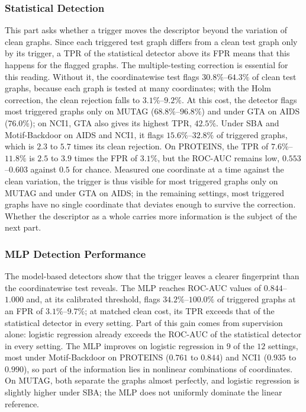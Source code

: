 \documentclass[journal]{IEEEtran}
\begin{document}
\subsubsection{Statistical Detection}\label{sec:res-stat}
This part asks whether a trigger moves the descriptor beyond the variation of
clean graphs. Since each triggered test graph differs from a clean test graph
only by its trigger, a TPR of the statistical detector above its FPR means that
this happens for the flagged graphs. The multiple-testing correction is
essential for this reading. Without it, the coordinatewise test flags
$30.8\%$--$64.3\%$ of clean test graphs, because each graph is tested at many
coordinates; with the Holm correction, the clean rejection falls to
$3.1\%$--$9.2\%$. At this cost, the detector flags most triggered graphs only
on MUTAG ($68.8\%$--$96.8\%$) and under GTA on AIDS ($76.0\%$); on NCI1, GTA also
gives its highest TPR, $42.5\%$. Under SBA and Motif-Backdoor on AIDS and NCI1,
it flags $15.6\%$--$32.8\%$ of triggered graphs, which is $2.3$ to $5.7$ times its
clean rejection. On PROTEINS, the TPR of $7.6\%$--$11.8\%$ is $2.5$ to $3.9$ times
the FPR of $3.1\%$, but the ROC-AUC remains low, $0.553$--$0.603$ against $0.5$
for chance. Measured one coordinate at a time against the clean variation, the
trigger is thus visible for most triggered graphs only on MUTAG and under GTA
on AIDS; in the remaining settings, most triggered graphs have no single
coordinate that deviates enough to survive the correction. Whether the
descriptor as a whole carries more information is the subject of the next
part.

\subsubsection{MLP Detection Performance}\label{sec:res-mlp}
The model-based detectors show that the trigger leaves a clearer fingerprint
than the coordinatewise test reveals. The MLP reaches ROC-AUC values of
$0.844$--$1.000$ and, at its calibrated threshold, flags $34.2\%$--$100.0\%$ of
triggered graphs at an FPR of $3.1\%$--$9.7\%$; at matched clean cost, its TPR
exceeds that of the statistical detector in every setting. Part of this gain
comes from supervision alone: logistic regression already exceeds the ROC-AUC
of the statistical detector in every setting. The MLP improves on logistic
regression in $9$ of the $12$ settings, most under Motif-Backdoor on PROTEINS
($0.761$ to $0.844$) and NCI1 ($0.935$ to $0.990$), so part of the information
lies in nonlinear combinations of coordinates. On MUTAG, both separate the
graphs almost perfectly, and logistic regression is slightly higher under SBA;
the MLP does not uniformly dominate the linear reference.
\end{document}
